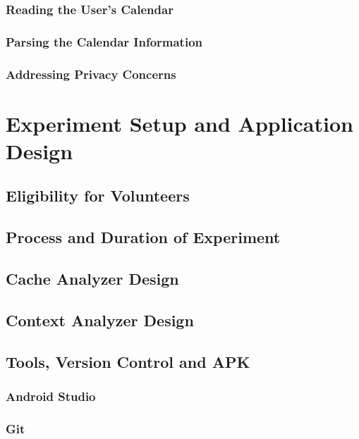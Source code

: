 \documentclass[12pt]{uthesis-v12}  %
\begin{document}
		\subsection{Reading the User's Calendar}
		
		\subsection{Parsing the Calendar Information}
		
		\subsection{Addressing Privacy Concerns}

\chapter{Experiment Setup and Application Design}
	
	\section{Eligibility for Volunteers}
	
	\section{Process and Duration of Experiment}
	
	\section{Cache Analyzer Design}
	
	\section{Context Analyzer Design}
	
	\section{Tools, Version Control and APK}
		
		\subsection{Android Studio}
		
		\subsection{Git}
		
\end{document}
